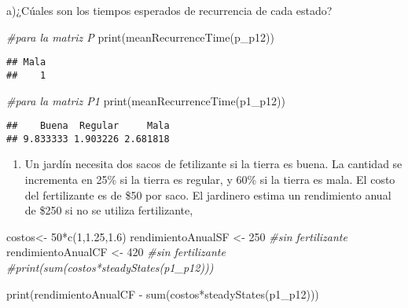 \documentclass[
]{article}
\newenvironment{Shaded}{\begin{snugshade}}{\end{snugshade}}
\newcommand{\CommentTok}[1]{\textcolor[rgb]{0.56,0.35,0.01}{\textit{#1}}}
\newcommand{\DecValTok}[1]{\textcolor[rgb]{0.00,0.00,0.81}{#1}}
\newcommand{\FloatTok}[1]{\textcolor[rgb]{0.00,0.00,0.81}{#1}}
\newcommand{\FunctionTok}[1]{\textcolor[rgb]{0.00,0.00,0.00}{#1}}
\newcommand{\NormalTok}[1]{#1}
\newcommand{\OtherTok}[1]{\textcolor[rgb]{0.56,0.35,0.01}{#1}}
\newcommand{\SpecialCharTok}[1]{\textcolor[rgb]{0.00,0.00,0.00}{#1}}
\providecommand{\tightlist}{%
  \setlength{\itemsep}{0pt}\setlength{\parskip}{0pt}}
\begin{document}
a)¿Cúales son los tiempos esperados de recurrencia de cada estado?

\begin{Shaded}
\begin{Highlighting}[]
\CommentTok{\#para la matriz P}
\FunctionTok{print}\NormalTok{(}\FunctionTok{meanRecurrenceTime}\NormalTok{(p\_p12))}
\end{Highlighting}
\end{Shaded}

\begin{verbatim}
## Mala 
##    1
\end{verbatim}

\begin{Shaded}
\begin{Highlighting}[]
\CommentTok{\#para la matriz P1}
\FunctionTok{print}\NormalTok{(}\FunctionTok{meanRecurrenceTime}\NormalTok{(p1\_p12))}
\end{Highlighting}
\end{Shaded}

\begin{verbatim}
##    Buena  Regular     Mala 
## 9.833333 1.903226 2.681818
\end{verbatim}

\begin{enumerate}
\def\labelenumi{\alph{enumi})}
\setcounter{enumi}{1}
\tightlist
\item
  Un jardín necesita dos sacos de fetilizante si la tierra es buena. La
  cantidad se incrementa en 25\% si la tierra es regular, y 60\% si la
  tierra es mala. El costo del fertilizante es de \$50 por saco. El
  jardinero estima un rendimiento anual de \$250 si no se utiliza
  fertilizante,
\end{enumerate}

\begin{Shaded}
\begin{Highlighting}[]
\NormalTok{costos}\OtherTok{\textless{}{-}} \DecValTok{50}\SpecialCharTok{*}\FunctionTok{c}\NormalTok{(}\DecValTok{1}\NormalTok{,}\FloatTok{1.25}\NormalTok{,}\FloatTok{1.6}\NormalTok{)}
\NormalTok{rendimientoAnualSF }\OtherTok{\textless{}{-}} \DecValTok{250} \CommentTok{\#sin fertilizante}
\NormalTok{rendimientoAnualCF }\OtherTok{\textless{}{-}} \DecValTok{420} \CommentTok{\#sin fertilizante}
\CommentTok{\#print(sum(costos*steadyStates(p1\_p12)))}

\FunctionTok{print}\NormalTok{(rendimientoAnualCF }\SpecialCharTok{{-}} \FunctionTok{sum}\NormalTok{(costos}\SpecialCharTok{*}\FunctionTok{steadyStates}\NormalTok{(p1\_p12)))}
\end{Highlighting}
\end{Shaded}
\end{document}
